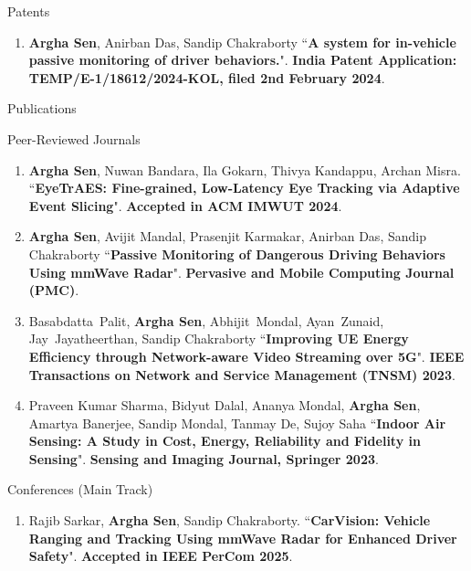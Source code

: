 \documentclass{resume} %
\begin{document}
	\begin{rSection}{Patents}
		\begin{enumerate}
			\item \textbf{Argha Sen}, Anirban Das, Sandip Chakraborty ``\textbf{A system for in-vehicle passive monitoring of driver behaviors.}". \textbf{India Patent Application: TEMP/E-1/18612/2024-KOL, filed 2nd February 2024}.
		\end{enumerate} 
	\end{rSection}
	\newpage
	\begin{rSection}{Publications} 
		\begin{rSubsection}{Peer-Reviewed Journals}{}{}{}
			
			\begin{enumerate}
				\small
				\item \textbf{Argha Sen}, Nuwan Bandara, Ila Gokarn, Thivya Kandappu, Archan Misra.
				``\textbf{EyeTrAES: Fine-grained, Low-Latency Eye Tracking via Adaptive Event Slicing}".
				\textbf{Accepted in ACM IMWUT 2024}.
				
				\item \textbf{Argha Sen}, Avijit Mandal, Prasenjit Karmakar, Anirban Das, Sandip Chakraborty ``\textbf{Passive Monitoring of Dangerous Driving Behaviors Using mmWave Radar}". \textbf{Pervasive and Mobile Computing Journal (PMC)}.
				
				\item Basabdatta~Palit, \textbf{Argha Sen}, Abhijit~Mondal, Ayan~Zunaid, Jay~Jayatheerthan, Sandip Chakraborty ``\textbf{Improving UE Energy Efficiency through Network-aware Video Streaming over 5G}". \textbf{IEEE Transactions on Network and Service Management (TNSM) 2023}.
				
				\item Praveen Kumar Sharma, Bidyut Dalal, Ananya Mondal, \textbf{Argha Sen}, Amartya Banerjee, Sandip Mondal, Tanmay De, Sujoy Saha ``\textbf{Indoor Air Sensing: A Study in Cost, Energy, Reliability and Fidelity in Sensing}". \textbf{Sensing and Imaging Journal, Springer 2023}.
				
			\end{enumerate}
			
		\end{rSubsection}{}{}{}{}

		\begin{rSubsection}{Conferences (Main Track)}{}{}{}
			
			\begin{enumerate}
				\small
				\item Rajib Sarkar, \textbf{Argha Sen}, Sandip Chakraborty.	``\textbf{CarVision: Vehicle Ranging and Tracking Using mmWave Radar for Enhanced Driver Safety}". \textbf{Accepted in IEEE PerCom 2025}.
				

\end{enumerate}
\end{rSubsection}
\end{rSection}
\end{document}
